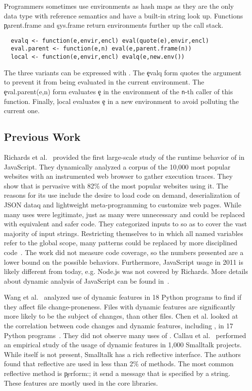\documentclass[screen,acmsmall]{acmart}
\begin{document}
\noindent Programmers sometimes use environments as hash maps as they are the
only data type with reference semantics and have a built-in string look up.
Functions \c{parent.frame} and \c{sys.frame} return environments further up the
call stack.
 \begin{lstlisting}
  evalq <- function(e,envir,encl) eval(quote(e),envir,encl)
  eval.parent <- function(e,n) eval(e,parent.frame(n))
  local <- function(e,envir,encl) evalq(e,new.env())
\end{lstlisting}
The three \eval variants can be expressed with \eval. The \c{evalq} form quotes
the argument to prevent it from being evaluated in the current environment. The
\c{eval.parent(e,n)} form evaluates \c{e} in the environment of the {\tt n}-th
caller of this function. Finally, \c{local} evaluates \c{e} in a new environment
to avoid polluting the current one.



\subsection{Previous Work}

Richards et al.~\cite{ecoop11} provided the first large-scale study of
the runtime behavior of \eval in JavaScript. They dynamically analyzed
a corpus of the 10,000 most popular websites with an instrumented web
browser to gather execution traces. They show that \eval is pervasive
with 82\% of the most popular websites using it. The reasons for its
use include the desire to load code on demand, deserialization of JSON
dataq and lightweight meta-programming to customize web pages. While
many uses were legitimate, just as many were unnecessary and could be
replaced with equivalent and safer code. They categorized inputs to
\eval so as to cover the vast majority of input strings. Restricting
themselves to \eval in which all named variables refer to the global
scope, many patterns could be replaced by more disciplined
code~\cite{oopsla12b, moller12}. The work did not measure code
coverage, so the numbers presented are a lower bound on the possible
behaviors. Furthermore, JavaScript usage in 2011 is likely different
from today, e.g. Node.js was not covered by Richards. More details
about dynamic analysis of JavaScript can be found in~\cite{liang}.

Wang et al.~\cite{wang} analyzed use of dynamic features in 18 Python
programs to find if they affect file change-proneness. Files with
dynamic features are significantly more likely to be the subject of
changes, than other files. Chen et al. looked at the correlation
between code changes and dynamic features, including \eval, in 17
Python programs~\cite{chen}. They did not observe many uses of \eval.
Callau et al.~\cite{oscar} performed an empirical study of the usage
of dynamic features in 1,000 Smalltalk projects. While \eval itself is
not present, Smalltalk has a rich reflective interface. The authors
found that reflective are used in less than 2\% of methods. The most
common reflective method is \c{perform:}; it send a message that is
specified by a string. These features are mostly used in the core
libraries.
\end{document}
